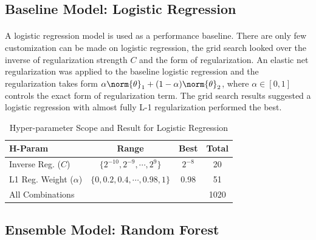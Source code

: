 \documentclass[11pt]{article}
\begin{document}
	\subsection{Baseline Model: Logistic Regression}
	\paragraph{} A logistic regression model is used as a performance baseline. There are only few customization can be made on logistic regression, the grid search looked over the inverse of regularization strength $C$ and the form of regularization. An elastic net regularization was applied to the baseline logistic regression and the regularization takes form $\alpha \norm{\theta}_1 + (1 - \alpha) \norm{\theta}_2$, where $\alpha \in [0, 1]$ controls the exact form of regularization term. The grid search results suggested a logistic regression with almost fully L-1 regularization performed the best.
	\begin{table}[H]
		\centering
		\begin{tabular}{l|c|c|c}
		H-Param & Range & Best & Total \\
 		\hline
 		Inverse Reg. ($C$) & $\{2^{-10}, 2^{-9}, \cdots, 2^9\}$ & $2^{-8}$ & 20 \\
 		L1 Reg. Weight ($\alpha$) & $\{0, 0.2, 0.4, \cdots, 0.98, 1\}$ & 0.98 & 51 \\
 		\hline
 		All Combinations & & & 1020 
		\end{tabular}
		\caption{Hyper-parameter Scope and Result for Logistic Regression}
	\end{table}
 	
 	\subsection{Ensemble Model: Random Forest}
\end{document}
